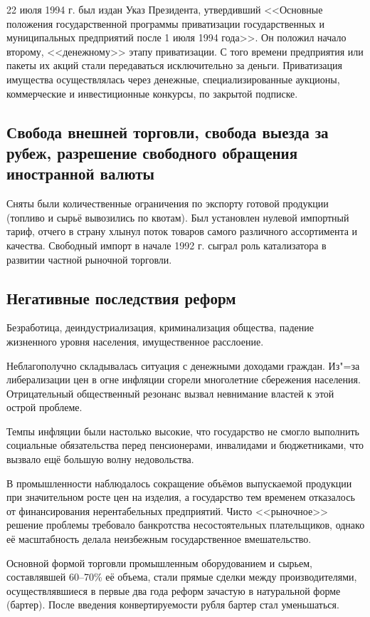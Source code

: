 22 июля 1994 г. был издан Указ Президента, утвердивший <<Основные положения государственной программы приватизации государственных и муниципальных предприятий после 1 июля 1994 года>>. Он положил начало второму, <<денежному>> этапу приватизации. С того времени предприятия или пакеты их акций стали передаваться исключительно за деньги. Приватизация имущества осуществлялась через денежные, специализированные аукционы, коммерческие и инвестиционные конкурсы, по закрытой подписке.
\subsection{Свобода внешней торговли, свобода выезда за рубеж, разрешение свободного обращения иностранной валюты}
Сняты были количественные ограничения по экспорту готовой продукции (топливо и сырьё вывозились по квотам). Был установлен нулевой импортный тариф, отчего в страну хлынул поток товаров самого различного ассортимента и качества. Свободный импорт в начале 1992 г. сыграл роль катализатора в развитии частной рыночной торговли. 
\subsection{Негативные последствия реформ}
Безработица, деиндустриализация, криминализация общества, падение жизненного уровня населения, имущественное расслоение.

Неблагополучно складывалась ситуация с денежными доходами граждан. Из"=за либерализации цен в огне инфляции сгорели многолетние сбережения населения. Отрицательный общественный резонанс вызвал невнимание властей к этой острой проблеме.

Темпы инфляции были настолько высокие, что государство не смогло выполнить социальные обязательства перед пенсионерами, инвалидами и бюджетниками, что вызвало ещё большую волну недовольства.

В промышленности наблюдалось сокращение объёмов выпускаемой продукции при значительном росте цен на изделия, а государство тем временем отказалось от финансирования нерентабельных предприятий. Чисто <<рыночное>> решение проблемы требовало банкротства несостоятельных плательщиков, однако её масштабность делала неизбежным государственное вмешательство.

Основной формой торговли промышленным оборудованием и сырьем, составлявшей 60--70\% её объема, стали прямые сделки между производителями, осуществлявшиеся в первые два года реформ зачастую в натуральной форме (бартер). После введения конвертируемости рубля бартер стал уменьшаться.

